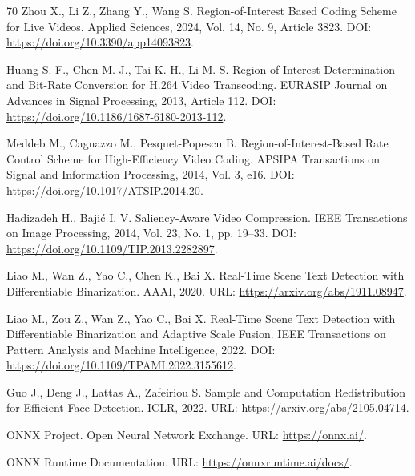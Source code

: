 \documentclass[12pt,a4paper,oneside,openany]{report}
\begin{document}
\begin{thebibliography}{70}
  Zhou X., Li Z., Zhang Y., Wang S. Region-of-Interest Based Coding Scheme for Live Videos.
  Applied Sciences, 2024, Vol. 14, No. 9, Article 3823. DOI:
  \url{https://doi.org/10.3390/app14093823}.

  Huang S.-F., Chen M.-J., Tai K.-H., Li M.-S. Region-of-Interest Determination and Bit-Rate
  Conversion for H.264 Video Transcoding. EURASIP Journal on Advances in Signal Processing, 2013,
  Article 112. DOI: \url{https://doi.org/10.1186/1687-6180-2013-112}.

  Meddeb M., Cagnazzo M., Pesquet-Popescu B. Region-of-Interest-Based Rate Control Scheme for
  High-Efficiency Video Coding. APSIPA Transactions on Signal and Information Processing, 2014,
  Vol. 3, e16. DOI: \url{https://doi.org/10.1017/ATSIP.2014.20}.

  Hadizadeh H., Bajić I. V. Saliency-Aware Video Compression. IEEE Transactions on Image
  Processing, 2014, Vol. 23, No. 1, pp. 19--33. DOI:
  \url{https://doi.org/10.1109/TIP.2013.2282897}.


  Liao M., Wan Z., Yao C., Chen K., Bai X. Real-Time Scene Text Detection with Differentiable
  Binarization. AAAI, 2020. URL: \url{https://arxiv.org/abs/1911.08947}.

  Liao M., Zou Z., Wan Z., Yao C., Bai X. Real-Time Scene Text Detection with Differentiable
  Binarization and Adaptive Scale Fusion. IEEE Transactions on Pattern Analysis and Machine
  Intelligence, 2022. DOI: \url{https://doi.org/10.1109/TPAMI.2022.3155612}.

  Guo J., Deng J., Lattas A., Zafeiriou S. Sample and Computation Redistribution for Efficient
  Face Detection. ICLR, 2022. URL: \url{https://arxiv.org/abs/2105.04714}.


  ONNX Project. Open Neural Network Exchange. URL: \url{https://onnx.ai/}.

  ONNX Runtime Documentation. URL: \url{https://onnxruntime.ai/docs/}.


\end{thebibliography}
\end{document}
